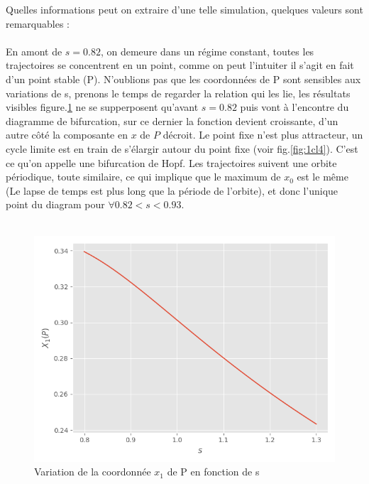 \documentclass{wsdcr}
\begin{document}
Quelles informations peut on extraire d'une telle simulation, quelques valeurs sont remarquables : 
\\ \\
 En amont de $s=0.82$, on demeure dans un régime constant, toutes les trajectoires se concentrent en un point, comme on peut l'intuiter il s'agit en fait d'un point stable (P). N'oublions pas que les coordonnées de P sont sensibles aux variations de s, prenons le temps de regarder la relation qui les lie, les résultats visibles figure.\ref{fig:x0S} ne se supperposent qu'avant $s=0.82$  puis vont à l'encontre du diagramme de bifurcation, sur ce dernier la fonction devient croissante, d'un autre côté la composante en $x$ de $P$ décroit. Le point fixe n'est plus attracteur, un cycle limite est en train de s'élargir autour du point fixe (voir fig.\ref{fig:1cl4}). C'est ce qu'on appelle une bifurcation de Hopf. Les trajectoires suivent une orbite périodique, toute similaire, ce qui implique que le maximum de $x_0$ est le même (Le lapse de temps est plus long que la période de l'orbite), et donc l'unique point du diagram pour $\forall 0.82<s<0.93$.  \\ \\
 \begin{figure}
    \centering
    \includegraphics[width=\linewidth]{fig/lv4_x0S.png}
    \caption{Variation de la coordonnée $x_1$ de P en fonction de s}
    \label{fig:x0S}
\end{figure}
\end{document}

